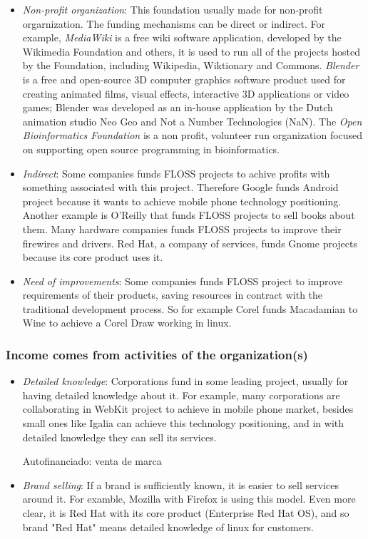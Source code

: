 			\begin{itemize}	
			\item \emph{Non-profit organization}: This foundation usually made for non-profit orgarnization. The funding mechanisms can be direct or indirect.  For example, \emph{MediaWiki} is a free wiki software application, developed by the Wikimedia Foundation and others, it is used to run all of the projects hosted by the Foundation, including Wikipedia, Wiktionary and Commons. \emph{Blender} is a free and open-source 3D computer graphics software product used for creating animated films, visual effects, interactive 3D applications or video games; Blender was developed as an in-house application by the Dutch animation studio Neo Geo and Not a Number Technologies (NaN). The \emph{Open Bioinformatics Foundation} is a non profit, volunteer run organization focused on supporting open source programming in bioinformatics. 
			\item \emph{Indirect}: Some companies funds FLOSS projects to achive profits with something associated with this project. Therefore Google funds Android project because it wants to achieve mobile phone technology positioning. Another example is O'Reilly that funds FLOSS projects to sell books about them. Many hardware companies funds FLOSS projects to improve their firewires and drivers. Red Hat, a company of services, funds Gnome projects because its core product uses it.
			
			\item \emph{Need of improvements}: Some companies funds FLOSS project to improve requirements of their products, saving resources in contract with the traditional development process. So for example Corel funds Macadamian to Wine to achieve a Corel Draw working in linux.
			
			\end{itemize}
		
		\subsubsection{Income comes from activities of the organization(s)}
			\begin{itemize}	
				\item \emph{Detailed knowledge}: Corporations fund in some leading project, usually for having detailed knowledge about it. For example, many corporations are collaborating in WebKit project to achieve in mobile phone market, besides small ones like Igalia can achieve this technology positioning, and in with detailed knowledge they can sell its services.

Autofinanciado: venta de marca
				\item \emph{Brand selling}: If a brand is sufficiently known, it is easier to sell services around it. For examble, Mozilla with Firefox is using this model. Even more clear, it is Red Hat with its core product (Enterprise Red Hat OS), and so brand "Red Hat" means detailed knowledge of linux for customers.

			\end{itemize}
